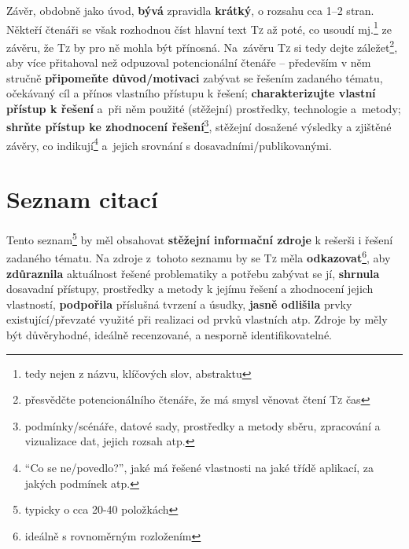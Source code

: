 \documentclass[a4paper,11pt, twoside]{report}
\begin{document}
Závěr, obdobně jako úvod, \textbf{bývá} zpravidla \textbf{krátký}, o rozsahu cca 1--2 stran.
Někteří čtenáři se však rozhodnou číst hlavní text \textsc{Tz} až poté,
co usoudí mj.\footnote{tedy nejen z názvu, klíčových slov, abstraktu} ze závěru, že \textsc{Tz} by pro ně mohla být přínosná.
Na~závěru \textsc{Tz} si tedy dejte záležet\footnote{přesvědčte potencionálního čtenáře, že má smysl věnovat čtení \textsc{Tz} čas}, aby více přitahoval než odpuzoval potencionální čtenáře  -- především v něm
stručně 
\textbf{připomeňte důvod/motivaci} zabývat se řešením zadaného tématu,
očekávaný cíl a přínos vlastního přístupu k řešení;
\textbf{charakterizujte vlastní přístup k řešení} a~při něm použité (stěžejní) prostředky, technologie a~metody;
\textbf{shrňte přístup ke zhodnocení řešení}\footnote{podmínky/scénáře, datové sady, prostředky a metody sběru, zpracování a vizualizace dat, jejich rozsah atp.},
stěžejní dosažené výsledky a zjištěné závěry,
co indikují\footnote{``Co se ne/povedlo?'', jaké má řešené vlastnosti na jaké třídě aplikací, za jakých podmínek atp.}
a~jejich srovnání s dosavadními/publikovanými.

\vspace{8mm}

\parbox{\textwidth}{
\centering

\scalebox{2.5}{
\faList
}
\vspace{-8mm}
}



\section{Seznam citací}

Tento seznam\footnote{typicky o cca 20-40 položkách} by měl obsahovat \textbf{stěžejní informační zdroje}
k rešerši i řešení zadaného tématu. 
Na zdroje z~tohoto seznamu by se \textsc{Tz} měla \textbf{odkazovat}\footnote{ideálně s rovnoměrným rozložením}, 
aby
\textbf{zdůraznila} aktuálnost řešené problematiky
a potřebu zabývat se jí,
\textbf{shrnula} dosavadní přístupy, prostředky a metody k jejímu řešení a zhodnocení jejich vlastností, 
\textbf{podpořila} příslušná tvrzení a úsudky,
\textbf{jasně odlišila} prvky existující/převzaté využité při realizaci od prvků vlastních atp.
Zdroje by měly být důvěryhodné, ideálně recenzované, a nesporně identifikovatelné.

\vspace{8mm}

\parbox{\textwidth}{
\centering

\scalebox{2.5}{
\faTags
}
\vspace{-8mm}
}
\end{document}
